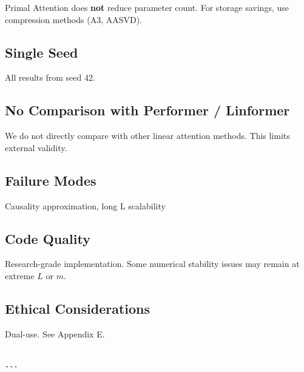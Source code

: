 Primal Attention does \textbf{not} reduce parameter count. For storage savings, 
use compression methods (A3, AASVD).

\subsection{Single Seed}

All results from seed 42.

\subsection{No Comparison with Performer / Linformer}

We do not directly compare with other linear attention methods. This limits 
external validity.

\subsection{Failure Modes}

Causality approximation, long L scalability

\subsection{Code Quality}

Research-grade implementation. Some numerical stability issues may remain 
at extreme $L$ or $m$.

\subsection{Ethical Considerations}

Dual-use. See Appendix E.
\begin{lstlisting}

---
\end{lstlisting}